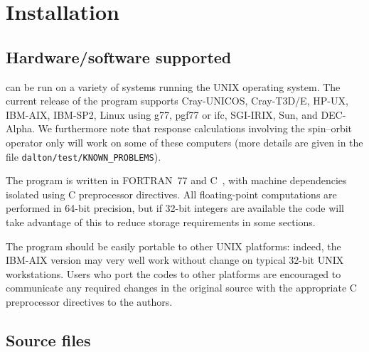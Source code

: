 \chapter{Installation}\label{ch:install}

\section{Hardware/software
supported}\label{sec:hardsoft}

{\dalton} can be run on a variety of systems running the UNIX
operating system. The current release of the program supports
Cray-UNICOS,
Cray-T3D/E,
HP-UX,
IBM-AIX,
IBM-SP2,
Linux using g77, pgf77 or ifc,
SGI-IRIX,
Sun,
and DEC-Alpha.
We furthermore note that response calculations involving the
spin--orbit operator only will work on some of these
computers (more details are given in the file
\verb|dalton/test/KNOWN_PROBLEMS|).

The program is written in FORTRAN~77 and C~, with
machine dependencies isolated using C preprocessor directives.  All floating-point computations are
performed in 64-bit precision, but if 32-bit integers are
available the code will take advantage of this to reduce storage
requirements in some sections.

The program should be easily portable to other UNIX
platforms: indeed, the IBM-AIX version
may very well work without change on typical 32-bit UNIX workstations.
Users who port the codes to other platforms are encouraged to
communicate any required changes in the original source with the
appropriate C preprocessor directives to the authors.

\section{Source files}\label{sec:source}

